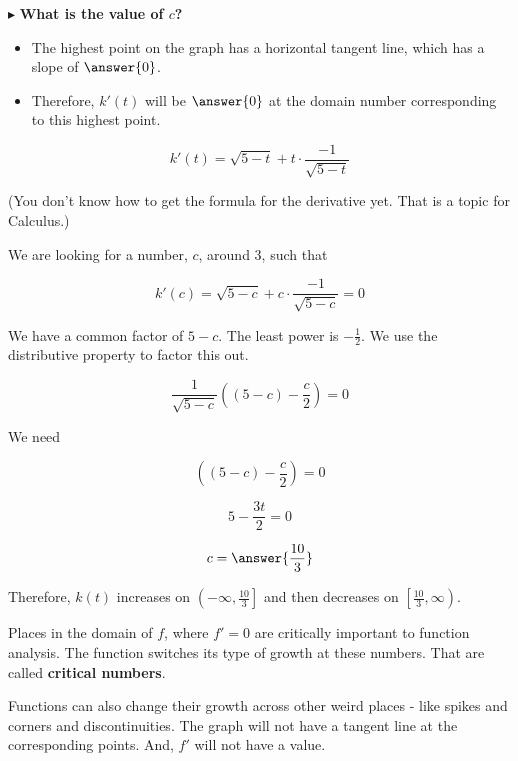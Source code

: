 \documentclass{ximera}
\begin{document}
$\blacktriangleright$ \textbf{What is the value of $c$?} \\

\begin{explanation}


\begin{itemize}
\item The highest point on the graph has a horizontal tangent line, which has a slope of $\answer{0}$.  
\item Therefore, $k'(t)$ will be $\answer{0}$ at the domain number corresponding to this highest point.
\end{itemize}




\[   k'(t) = \sqrt{5-t} + t \cdot \frac{-1}{\sqrt{5-t}}    \]

(You don't know how to get the formula for the derivative yet.  That is a topic for Calculus.)

We are looking for a number, $c$, around $3$, such that 


\[   k'(c) = \sqrt{5-c} + c \cdot \frac{-1}{\sqrt{5-c}}  = 0  \]

We have a common factor of $5-c$.  The least power is $-\frac{1}{2}$.  We use the distributive property to factor this out.


\[  \frac{1}{\sqrt{5-c}} \left( (5-c) - \frac{c}{2} \right) = 0  \]




We need 


\[  \left( (5-c) - \frac{c}{2} \right) = 0  \]

\[  5 - \frac{3t}{2}  = 0  \]


\[  c = \answer{\frac{10}{3}}  \]


\end{explanation}


Therefore, $k(t)$ increases on $\left(-\infty, \frac{10}{3}\right]$ and then decreases on $\left[\frac{10}{3},\infty\right)$.









Places in the domain of $f$, where $f' = 0$ are critically important to function analysis. The function switches its type of growth at these numbers.  That are called \textbf{critical numbers}.

Functions can also change their growth across other weird places - like spikes and corners and discontinuities.  The graph will not have a tangent line at the corresponding points. And, $f'$ will not have a value.
\end{document}
